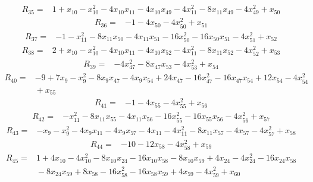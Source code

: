\begin{align*}
R_{35}={}& 1 + x_{10} - x_{10}^{2} - 4x_{10}x_{11} - 4x_{10}x_{49} - 4x_{11}^{2} - 8x_{11}x_{49} - 4x_{49}^{2} + x_{50}
\end{align*}
\begin{align*}
R_{36}={}& -1 - 4x_{50} - 4x_{50}^{2} + x_{51}
\end{align*}
\begin{align*}
R_{37}={}& -1 - x_{11}^{2} - 8x_{11}x_{50} - 4x_{11}x_{51} - 16x_{50}^{2} - 16x_{50}x_{51} - 4x_{51}^{2} + x_{52}
\end{align*}
\begin{align*}
R_{38}={}& 2 + x_{10} - x_{10}^{2} - 4x_{10}x_{11} - 4x_{10}x_{52} - 4x_{11}^{2} - 8x_{11}x_{52} - 4x_{52}^{2} + x_{53}
\end{align*}
\begin{align*}
R_{39}={}& -4x_{47}^{2} - 8x_{47}x_{53} - 4x_{53}^{2} + x_{54}
\end{align*}
\begin{align*}
R_{40}={}& -9 + 7x_{9} - x_{9}^{2} - 8x_{9}x_{47} - 4x_{9}x_{54} + 24x_{47} - 16x_{47}^{2} - 16x_{47}x_{54} + 12x_{54} - 4x_{54}^{2} \\
&{} + x_{55}
\end{align*}
\begin{align*}
R_{41}={}& -1 - 4x_{55} - 4x_{55}^{2} + x_{56}
\end{align*}
\begin{align*}
R_{42}={}& -x_{11}^{2} - 8x_{11}x_{55} - 4x_{11}x_{56} - 16x_{55}^{2} - 16x_{55}x_{56} - 4x_{56}^{2} + x_{57}
\end{align*}
\begin{align*}
R_{43}={}& -x_{9} - x_{9}^{2} - 4x_{9}x_{11} - 4x_{9}x_{57} - 4x_{11} - 4x_{11}^{2} - 8x_{11}x_{57} - 4x_{57} - 4x_{57}^{2} + x_{58}
\end{align*}
\begin{align*}
R_{44}={}& -10 - 12x_{58} - 4x_{58}^{2} + x_{59}
\end{align*}
\begin{align*}
R_{45}={}& 1 + 4x_{10} - 4x_{10}^{2} - 8x_{10}x_{24} - 16x_{10}x_{58} - 8x_{10}x_{59} + 4x_{24} - 4x_{24}^{2} - 16x_{24}x_{58} \\
&{} - 8x_{24}x_{59} + 8x_{58} - 16x_{58}^{2} - 16x_{58}x_{59} + 4x_{59} - 4x_{59}^{2} + x_{60}
\end{align*}
